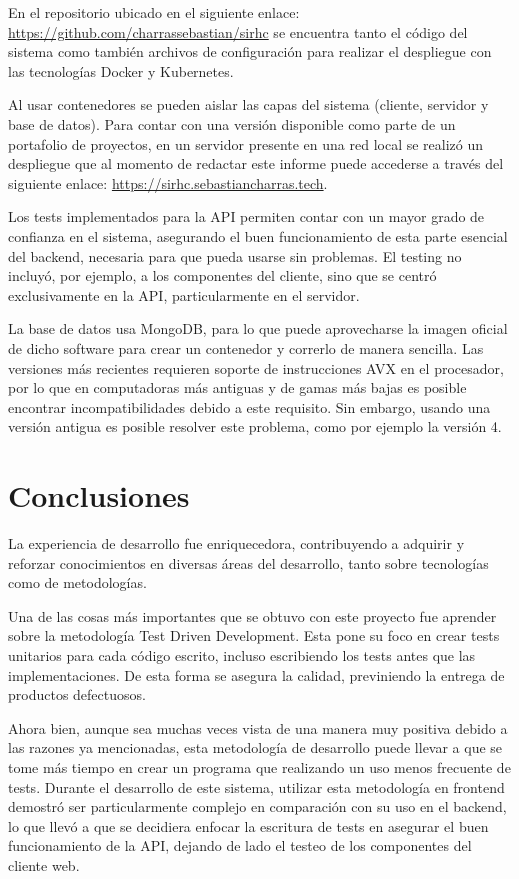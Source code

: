 \documentclass[twoside]{article}
\begin{document}
En el repositorio ubicado en el siguiente enlace: \href{https://github.com/charrassebastian/sirhc}{https://github.com/charrassebastian/sirhc} se encuentra tanto el código del sistema como también archivos de configuración para realizar el despliegue con las tecnologías Docker y Kubernetes.

Al usar contenedores se pueden aislar las capas del sistema (cliente, servidor y base de datos). Para contar con una versión disponible como parte de un portafolio de proyectos, en un servidor presente en una red local se realizó un despliegue que al momento de redactar este informe puede accederse a través del siguiente enlace: \href{https://sirhc.sebastiancharras.tech}{https://sirhc.sebastiancharras.tech}.

Los tests implementados para la API permiten contar con un mayor grado de confianza en el sistema, asegurando el buen funcionamiento de esta parte esencial del backend, necesaria para que pueda usarse sin problemas. El testing no incluyó, por ejemplo, a los componentes del cliente, sino que se centró exclusivamente en la API, particularmente en el servidor.

La base de datos usa MongoDB, para lo que puede aprovecharse la imagen oficial de dicho software para crear un contenedor y correrlo de manera sencilla. Las versiones más recientes requieren soporte de instrucciones AVX en el procesador, por lo que en computadoras más antiguas y de gamas más bajas es posible encontrar incompatibilidades debido a este requisito. Sin embargo, usando una versión antigua es posible resolver este problema, como por ejemplo la versión 4.
\section{Conclusiones}
La experiencia de desarrollo fue enriquecedora, contribuyendo a adquirir y reforzar conocimientos en diversas áreas del desarrollo, tanto sobre tecnologías como de metodologías.

Una de las cosas más importantes que se obtuvo con este proyecto fue aprender sobre la metodología Test Driven Development. Esta pone su foco en crear tests unitarios para cada código escrito, incluso escribiendo los tests antes que las implementaciones. De esta forma se asegura la calidad, previniendo la entrega de productos defectuosos.

Ahora bien, aunque sea muchas veces vista de una manera muy positiva debido a las razones ya mencionadas, esta metodología de desarrollo puede llevar a que se tome más tiempo en crear un programa que realizando un uso menos frecuente de tests. Durante el desarrollo de este sistema, utilizar esta metodología en frontend demostró ser particularmente complejo en comparación con su uso en el backend, lo que llevó a que se decidiera enfocar la escritura de tests en asegurar el buen funcionamiento de la API, dejando de lado el testeo de los componentes del cliente web.
\end{document}
